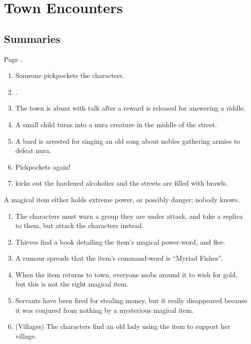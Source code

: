 \chapter{Town Encounters}

\setcounter{encnum}{1}

\section{Summaries}

\begin{multicols}{2}


Page \pageref{randommeetings}.

\begin{enumerate}

	\item{Someone pickpockets the characters.}
	\item{.}
	\item{The town is abuzz with talk after a reward is released for answering a riddle.}
	\item{ A small child turns into a nura creature in the middle of the street.}
	\item{A bard is arrested for singing an old song about nobles gathering armies to defeat nura.}
	\item{ Pickpockets again!}
	\item{ kicks out the hardened alcoholics and the streets are filled with brawls.}

\end{enumerate}


A magical item either holds extreme power, or possibly danger; nobody knows.

\begin{enumerate}

	\item{The characters must warn a group they are under attack, and take a replica to them, but attack the characters instead.}
	\item{Thieves find a book detailing the item's magical power-word, and flee.}
	\item{A rumour spreads that the item's command-word is ``Myriad Fishes''.}
	\item{When the item returns to town, everyone mobs around it to wish for gold, but this is not the right magical item.}
	\item{Servants have been fired for stealing money, but it really disappeared because it was conjured from nothing by a mysterious magical item.}
	\item{(Villages) The characters find an old lady using the item to support her village.}
\end{enumerate}


\end{multicols}
